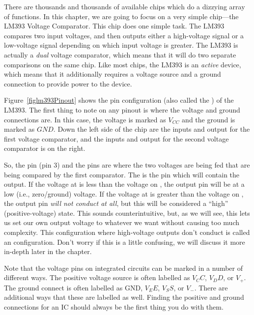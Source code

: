 There are thousands and thousands of available chips which do a dizzying array of functions.
In this chapter, we are going to focus on a very simple chip---the LM393 Voltage Comparator.
This chip does one simple task.
The LM393 compares two input voltages, and then outputs either a high-voltage signal or a low-voltage signal depending on which input voltage is greater.
The LM393 is actually a \emph{dual} voltage comparator, which means that it will do two separate comparisons on the same chip.
Like most chips, the LM393 is an \emph{active} device, which means that it additionally requires a voltage source and a ground connection to provide power to the device.


Figure~\ref{figlm393Pinout} shows the pin configuration (also called the ) of the LM393.
The first thing to note on any pinout is where the voltage and ground connections are.
In this case, the voltage is marked as $V_{CC}$ and the ground is marked as $GND$.
Down the left side of the chip are the inputs and output for the first voltage comparator, and the inputs and output for the second voltage comparator is on the right.

So, the  pin (pin 3) and the  pins are where the two voltages are being fed that are being compared by the first comparator.
The  is the pin which will contain the output.
If the voltage at  is less than the voltage on , the output pin will be at a low (i.e., zero/ground) voltage.
If the voltage at  is greater than the voltage on , the output pin \emph{will not conduct at all}, but this will be considered a ``high'' (positive-voltage) state.
This sounds counterintuitive, but, as we will see, this lets us set our own output voltage to whatever we want without causing too much complexity.
This configuration where high-voltage outputs don't conduct is called an  configuration.
Don't worry if this is a little confusing, we will discuss it more in-depth later in the chapter.

\begin{sidebar}
Note that the voltage pins on integrated circuits can be marked in a number of different ways.
The positive voltage source is often labelled as $V_CC$, $V_DD$, or $V_+$.
The ground connect is often labelled as GND, $V_EE$, $V_SS$, or $V_-$.
There are additional ways that these are labelled as well.
Finding the positive and ground connections for an IC should always be the first thing you do with them.
\end{sidebar}

